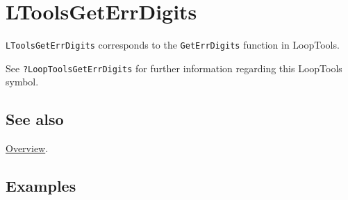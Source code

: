 \documentclass[../FeynHelpersManual.tex]{subfiles}
\begin{document}
\hypertarget{ltoolsgeterrdigits}{
\section{LToolsGetErrDigits}\label{ltoolsgeterrdigits}}

\texttt{LToolsGetErrDigits} corresponds to the \texttt{GetErrDigits}
function in LoopTools.

See \texttt{?LoopTools\textasciigrave GetErrDigits} for further
information regarding this LoopTools symbol.

\subsection{See also}

\hyperlink{toc}{Overview}.

\subsection{Examples}
\end{document}
